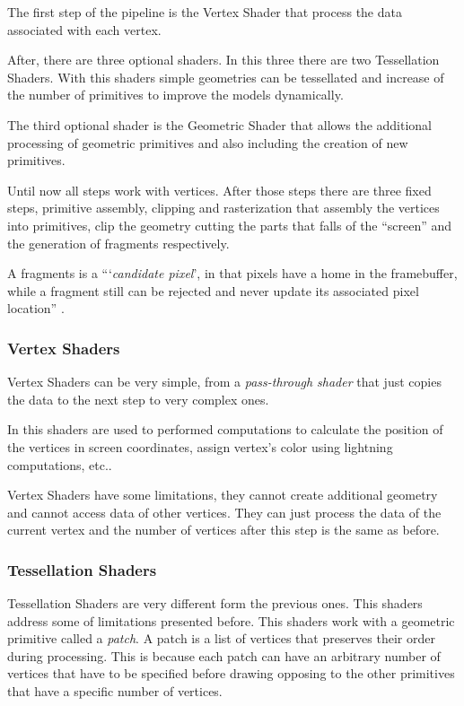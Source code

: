 The first step of the pipeline is the Vertex Shader that process the data associated with each vertex. 

After, there are three optional shaders. In this three there are two Tessellation Shaders. With this shaders simple geometries can be tessellated and increase of the number of primitives to improve the models dynamically.

The third optional shader is the Geometric Shader that allows the additional processing of geometric primitives and also including the creation of new primitives.

Until now all steps work with vertices. After those steps there are three fixed steps, primitive assembly, clipping and rasterization that assembly the vertices into primitives, clip the geometry cutting the parts that falls of the ``screen'' and the generation of fragments respectively.

A fragments is a ``‘\emph{candidate pixel}’, in that pixels have a home in the framebuffer, while a fragment still can be rejected and never update its associated pixel location'' \cite{shreiner2013opengl}.

\subsubsection{Vertex Shaders} %
\label{sub:vertex_shaders}
Vertex Shaders can be very simple, from a \emph{pass-through shader} that just copies the data to the next step to very complex ones.

In this shaders are used to performed computations to calculate the position of the vertices in screen coordinates, assign vertex's color using lightning computations, etc..

Vertex Shaders have some limitations, they cannot create additional geometry and cannot access data of other vertices. They can just process the data of the current vertex and the number of vertices after this step is the same as before.


\subsubsection{Tessellation Shaders} %
\label{sub:tesselation_shaders}
Tessellation Shaders are very different form the previous ones. This shaders address some of limitations presented before.
This shaders work with a geometric primitive called a \emph{patch}. A patch is a list of vertices that preserves their order during processing. This is because each patch can have an arbitrary number of vertices that have to be specified before drawing opposing to the other primitives that have a specific number of vertices.

